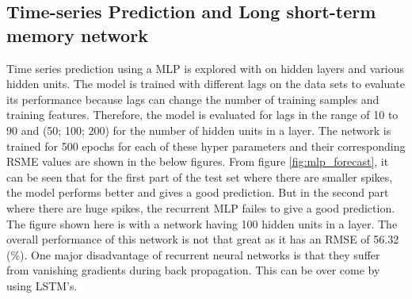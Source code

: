 \subsection{Time-series Prediction and Long short-term memory network}
Time series prediction using a MLP is explored with on hidden layers and various hidden units. The model is trained with different lags on the data sets to evaluate its performance because lags can change the number of training samples and training features. Therefore, the model is evaluated for lags in the range of 10 to 90 and (50; 100; 200) for the number of hidden units in a layer. The network is trained for 500 epochs for each of these hyper parameters and their corresponding RSME values are shown in the below figures. From figure \ref{fig:mlp_forecast}, it can be seen that for the first part of the test set where there are smaller spikes, the model performs better and gives a good prediction. But in the second part where there are huge spikes, the recurrent MLP failes to give a good prediction. The figure shown here is with a network having 100 hidden units in a layer. The overall performance of this network is not that great as it has an RMSE of 56.32 (\%). One major disadvantage of recurrent neural networks is that they suffer from vanishing gradients during back propagation. This can be over come by using LSTM's.


